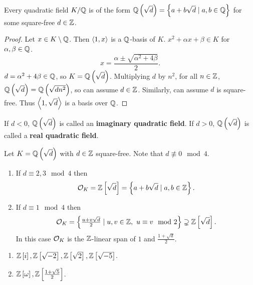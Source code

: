 \begin{lemma}
Every quadratic field $ K / \mathbb{Q} $ is of the form $ \mathbb{Q}\left( \sqrt{d} \right) = \left\{ a + b\sqrt{d} \mid a, b \in \mathbb{Q} \right\} $ for some square-free $ d \in \mathbb{Z} $.
\end{lemma}

\begin{proof}
Let $ x \in K \setminus \mathbb{Q} $. Then $ \left\langle 1, x \right\rangle $ is a $ \mathbb{Q} $-basis of $ K $. $ x^2 + \alpha x + \beta \in K $ for $ \alpha, \beta \in \mathbb{Q} $.
$$ x = \dfrac{\alpha \pm \sqrt{\alpha^2 + 4\beta}}{2}. $$
$ d = \alpha^2 + 4\beta \in \mathbb{Q} $, so $ K = \mathbb{Q}\left( \sqrt{d} \right) $. Multiplying $ d $ by $ n^2 $, for all $ n \in \mathbb{Z} $, $ \mathbb{Q}\left( \sqrt{d} \right) = \mathbb{Q}\left( \sqrt{dn^2} \right) $, so can assume $ d \in \mathbb{Z} $. Similarly, can assume $ d $ is square-free. Thus $ \left\langle 1, \sqrt{d} \right\rangle $ is a basis over $ \mathbb{Q} $.
\end{proof}

\begin{remark*}
If $ d < 0 $, $ \mathbb{Q}\left( \sqrt{d} \right) $ is called an \textbf{imaginary quadratic field}. If $ d > 0 $, $ \mathbb{Q}\left( \sqrt{d} \right) $ is called a \textbf{real quadratic field}.
\end{remark*}

\begin{theorem}
Let $ K = \mathbb{Q}\left( \sqrt{d} \right) $ with $ d \in \mathbb{Z} $ square-free. Note that $ d \not\equiv 0 \mod 4 $.
\begin{enumerate}
\item If $ d \equiv 2, 3 \mod 4 $ then
$$ \mathcal{O}_K = \mathbb{Z}\left[ \sqrt{d} \right] = \left\{ a + b\sqrt{d} \mid a, b \in \mathbb{Z} \right\}. $$
\item If $ d \equiv 1 \mod 4 $ then
$$ \mathcal{O}_K = \left\{ \tfrac{u + v\sqrt{d}}{2} \mid u, v \in \mathbb{Z}, \ u \equiv v \mod 2 \right\} \supsetneq \mathbb{Z}\left[ \sqrt{d} \right]. $$
In this case $ \mathcal{O}_K $ is the $ \mathbb{Z} $-linear span of $ 1 $ and $ \tfrac{1 + \sqrt{d}}{2} $.
\end{enumerate}
\end{theorem}

\begin{example*}
\hfill
\begin{enumerate}
\item $ \mathbb{Z}\left[ i \right], \mathbb{Z}\left[ \sqrt{-2} \right], \mathbb{Z}\left[ \sqrt{2} \right], \mathbb{Z}\left[ \sqrt{-5} \right] $.
\item $ \mathbb{Z}\left[ \omega \right], \mathbb{Z}\left[ \tfrac{1 + \sqrt{5}}{2} \right] $.
\end{enumerate}
\end{example*}

